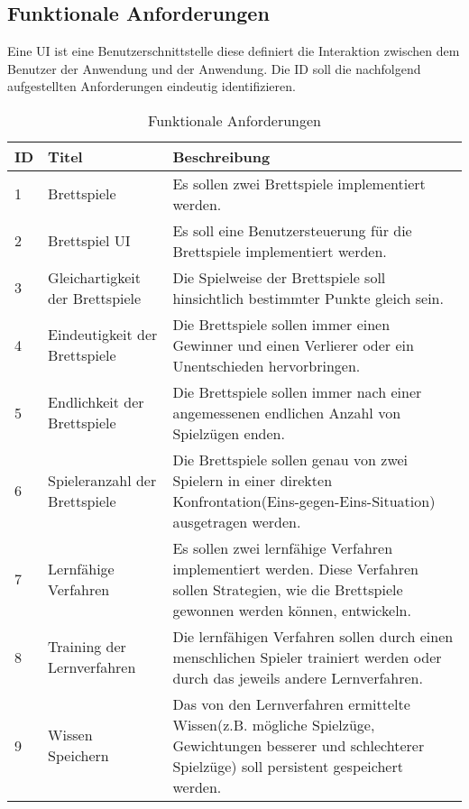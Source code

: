 \subsection{Funktionale Anforderungen}

Eine \ac{UI} ist eine Benutzerschnittstelle diese definiert die Interaktion zwischen dem Benutzer der Anwendung und der Anwendung. Die \ac{ID} soll die nachfolgend aufgestellten Anforderungen eindeutig identifizieren.

\begin{table}
\caption{Funktionale Anforderungen}
\begin{tabular}{ | p{} | p{} | p{} |}
\hline
\ac{ID} & Titel & Beschreibung \\ \hline
1 & Brettspiele & Es sollen zwei Brettspiele implementiert werden. \\ \hline
2 & Brettspiel \ac{UI} &  Es soll eine Benutzersteuerung für die Brettspiele implementiert werden. \\ \hline
3 & Gleichartigkeit der Brettspiele & Die Spielweise der Brettspiele soll hinsichtlich bestimmter Punkte gleich sein. \\ \hline
4 & Eindeutigkeit der Brettspiele & Die Brettspiele sollen immer einen Gewinner und einen Verlierer oder ein Unentschieden hervorbringen. \\ \hline
5 & Endlichkeit der Brettspiele & Die Brettspiele sollen immer nach einer angemessenen endlichen Anzahl von Spielzügen enden. \\ \hline
6 & Spieleranzahl der Brettspiele & Die Brettspiele sollen genau von zwei Spielern in einer direkten Konfrontation(Eins-gegen-Eins-Situation) ausgetragen werden. \\ \hline
7 & Lernfähige Verfahren & Es sollen zwei lernfähige Verfahren implementiert werden. Diese Verfahren sollen Strategien, wie die Brettspiele gewonnen werden können, entwickeln. \\ \hline
8 & Training der Lernverfahren & Die lernfähigen Verfahren sollen durch einen menschlichen Spieler trainiert werden oder durch das jeweils andere Lernverfahren. \\ \hline
9 & Wissen Speichern & Das von den Lernverfahren ermittelte Wissen(z.B. mögliche Spielzüge, Gewichtungen besserer und schlechterer Spielzüge) soll persistent gespeichert werden. \\ \hline
\end{tabular}
\label{tab:funktionale_anforderungen}
\end{table}

